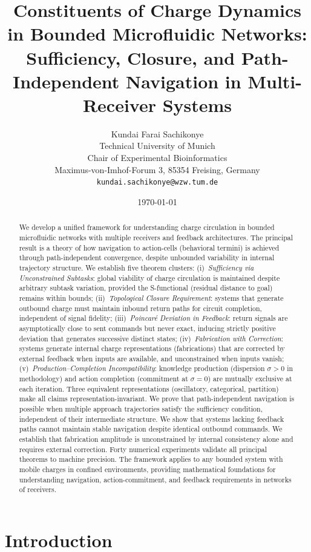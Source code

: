 \documentclass[twocolumn,11pt,a4paper]{article}
\title{\textbf{Constituents of Charge Dynamics in Bounded Microfluidic Networks:\\
Sufficiency, Closure, and Path-Independent Navigation in Multi-Receiver Systems}}
\author{Kundai Farai Sachikonye\\[2pt]
\small Technical University of Munich \\
\small Chair of Experimental Bioinformatics\\
\small Maximus-von-Imhof-Forum 3, 85354 Freising, Germany\\
\small \texttt{kundai.sachikonye@wzw.tum.de}}
\date{\today}
\begin{document}
\maketitle

\begin{abstract}
We develop a unified framework for understanding charge circulation in bounded microfluidic networks with multiple receivers and feedback architectures. The principal result is a theory of how navigation to action-cells (behavioral termini) is achieved through path-independent convergence, despite unbounded variability in internal trajectory structure. We establish five theorem clusters: (i)~\emph{Sufficiency via Unconstrained Subtasks}: global viability of charge circulation is maintained despite arbitrary subtask variation, provided the S-functional (residual distance to goal) remains within bounds; (ii)~\emph{Topological Closure Requirement}: systems that generate outbound charge must maintain inbound return paths for circuit completion, independent of signal fidelity; (iii)~\emph{Poincar\'{e} Deviation in Feedback}: return signals are asymptotically close to sent commands but never exact, inducing strictly positive deviation that generates successive distinct states; (iv)~\emph{Fabrication with Correction}: systems generate internal charge representations (fabrications) that are corrected by external feedback when inputs are available, and unconstrained when inputs vanish; (v)~\emph{Production--Completion Incompatibility}: knowledge production (dispersion $\sigma>0$ in methodology) and action completion (commitment at $\sigma=0$) are mutually exclusive at each iteration. Three equivalent representations (oscillatory, categorical, partition) make all claims representation-invariant. We prove that path-independent navigation is possible when multiple approach trajectories satisfy the sufficiency condition, independent of their intermediate structure. We show that systems lacking feedback paths cannot maintain stable navigation despite identical outbound commands. We establish that fabrication amplitude is unconstrained by internal consistency alone and requires external correction. Forty numerical experiments validate all principal theorems to machine precision. The framework applies to any bounded system with mobile charges in confined environments, providing mathematical foundations for understanding navigation, action-commitment, and feedback requirements in networks of receivers.
\end{abstract}

\section{Introduction}
\label{sec:introduction}
\end{document}
